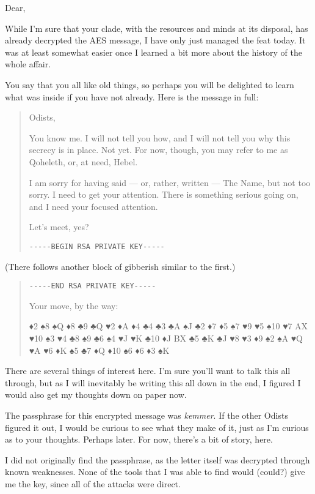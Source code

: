 Dear,

While I'm sure that your clade, with the resources and minds at its disposal, has already decrypted the AES message, I have only just managed the feat today. It was at least somewhat easier once I learned a bit more about the history of the whole affair.

You say that you all like old things, so perhaps you will be delighted to learn what was inside if you have not already. Here is the message in full:

\begin{quote}
Odists,

You know me. I will not tell you how, and I will not tell you why this secrecy is in place. Not yet. For now, though, you may refer to me as Qoheleth, or, at need, Hebel.

I am sorry for having said --- or, rather, written --- The Name, but not too sorry. I need to get your attention. There is something serious going on, and I need your focused attention.

Let's meet, yes?

\texttt{-\/-\/-\/-\/-BEGIN\ RSA\ PRIVATE\ KEY-\/-\/-\/-\/-}
\end{quote}

(There follows another block of gibberish similar to the first.)

\begin{quote}
\texttt{-\/-\/-\/-\/-END\ RSA\ PRIVATE\ KEY-\/-\/-\/-\/-}

Your move, by the way:

♦2 ♠8 ♠Q ♦8 ♣9 ♣Q ♥2 ♦A ♦4 ♣4 ♣3 ♣A ♠J ♣2 ♦7 ♦5 ♠7 ♥9 ♥5 ♠10 ♥7 AX ♥10 ♠3 ♥4 ♣8 ♠9 ♣6 ♠4 ♥J ♥K ♣10 ♦J BX ♣5 ♣K ♣J ♥8 ♥3 ♦9 ♠2 ♠A ♥Q ♥A ♥6 ♦K ♠5 ♣7 ♦Q ♦10 ♠6 ♦6 ♦3 ♠K
\end{quote}

There are several things of interest here. I'm sure you'll want to talk this all through, but as I will inevitably be writing this all down in the end, I figured I would also get my thoughts down on paper now.

The passphrase for this encrypted message was \emph{kemmer}. If the other Odists figured it out, I would be curious to see what they make of it, just as I'm curious as to your thoughts. Perhaps later. For now, there's a bit of story, here.

I did not originally find the passphrase, as the letter itself was decrypted through known weaknesses. None of the tools that I was able to find would (could?) give me the key, since all of the attacks were direct.

